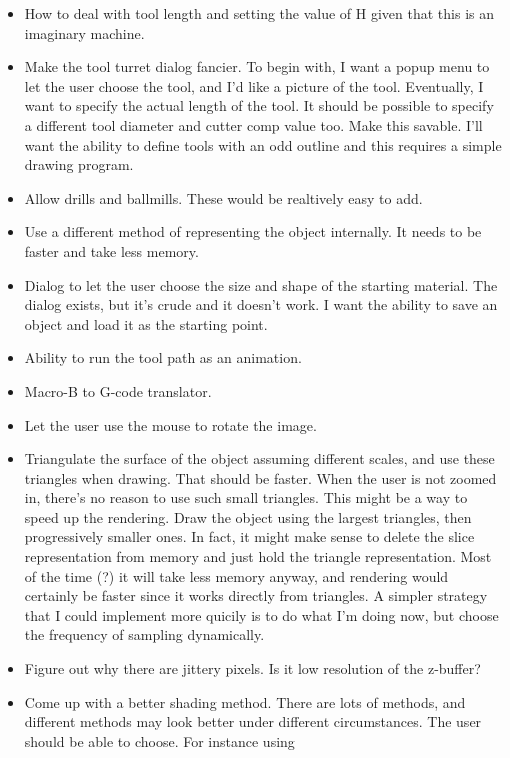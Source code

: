 \documentclass[titlepage,oneside,10pt]{article}
\begin{document}
\begin{itemize}
\item How to deal with tool length and setting the value of H given
  that this is an imaginary machine.
\item Make the tool turret dialog fancier. To begin with, I want a
  popup menu to let the user choose the tool, and I'd like a picture of the
  tool. Eventually, I want to specify the actual length of the
  tool. It should be possible to specify a different tool diameter and
  cutter comp value too. Make this savable. I'll want the ability to
  define tools with an odd outline and this requires a simple drawing
  program. 
\item Allow drills and ballmills. These would be realtively easy to add.
\item Use a different method of representing the object internally. It
  needs to be faster and take less memory.
\item Dialog to let the user choose the size and shape of the starting
  material. The dialog exists, but it's crude and it doesn't work. I
  want the ability to save an object and load it as the starting point.
\item Ability to run the tool path as an animation.
\item Macro-B to G-code translator.
\item Let the user use the mouse to rotate the image.
\item Triangulate the surface of the object assuming different scales,
  and use these triangles when drawing. That should be faster. When
  the user is not zoomed in, there's no reason to use such small
  triangles. This might be a way to speed up the rendering. Draw the
  object using the largest triangles, then progressively smaller
  ones. In fact, it might make sense to delete the slice
  representation from memory and just hold the triangle
  representation. Most of the time (?) it will take less memory
  anyway, and rendering would certainly be faster since it works
  directly from triangles. A simpler strategy that I could implement
  more quicily is to do what I'm doing now, but choose the frequency
  of sampling dynamically. 
\item Figure out why there are jittery pixels. Is it low resolution of
  the z-buffer?
\item Come up with a better shading method. There are lots of methods,
  and different methods may look better under different
  circumstances. The user should be able to choose. For instance using

\end{itemize}
\end{document}
